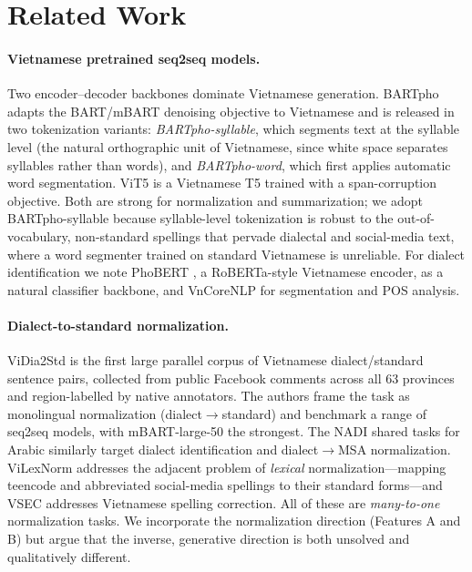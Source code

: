 \documentclass[11pt]{article}
\begin{document}
\section{Related Work}
\label{sec:related}

\paragraph{Vietnamese pretrained seq2seq models.}
Two encoder--decoder backbones dominate Vietnamese generation. BARTpho
\citep{tran2022bartpho} adapts the BART/mBART denoising objective
\citep{lewis2020bart,liu2020mbart} to Vietnamese and is released in two
tokenization variants: \emph{BARTpho-syllable}, which segments text at the
syllable level (the natural orthographic unit of Vietnamese, since white space
separates syllables rather than words), and \emph{BARTpho-word}, which first
applies automatic word segmentation. ViT5 \citep{phan2022vit5} is a Vietnamese
T5 \citep{raffel2020t5} trained with a span-corruption objective. Both are
strong for normalization and summarization; we adopt BARTpho-syllable because
syllable-level tokenization is robust to the out-of-vocabulary, non-standard
spellings that pervade dialectal and social-media text, where a word segmenter
trained on standard Vietnamese is unreliable. For dialect identification we note
PhoBERT \citep{nguyen2020phobert}, a RoBERTa-style Vietnamese encoder, as a
natural classifier backbone, and VnCoreNLP \citep{vu2018vncorenlp} for
segmentation and POS analysis.

\paragraph{Dialect-to-standard normalization.}
ViDia2Std \citep{ta2026vidia2std} is the first large parallel corpus of
Vietnamese dialect/standard sentence pairs, collected from public Facebook
comments across all 63 provinces and region-labelled by native annotators. The
authors frame the task as monolingual normalization (dialect$\rightarrow$standard)
and benchmark a range of seq2seq models, with mBART-large-50 the strongest. The
NADI shared tasks for Arabic \citep{nadi2024} similarly target dialect
identification and dialect$\rightarrow$MSA normalization. ViLexNorm
\citep{nguyen2024vilexnorm} addresses the adjacent problem of \emph{lexical}
normalization---mapping teencode and abbreviated social-media spellings to their
standard forms---and VSEC \citep{nguyen2021vsec} addresses Vietnamese spelling
correction. All of these are \emph{many-to-one} normalization tasks. We
incorporate the normalization direction (Features A and B) but argue that the
inverse, generative direction is both unsolved and qualitatively different.
\end{document}
